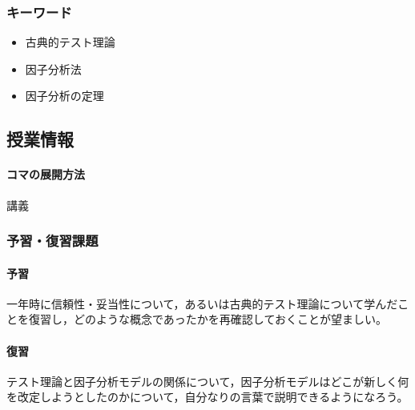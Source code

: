 \subsubsection{キーワード}
\begin{itemize}
	\item 古典的テスト理論
	\item 因子分析法
	\item 因子分析の定理
\end{itemize}
\subsection{授業情報}
\paragraph{コマの展開方法}
講義
\subsubsection{予習・復習課題}
\paragraph{予習}一年時に信頼性・妥当性について，あるいは古典的テスト理論について学んだことを復習し，どのような概念であったかを再確認しておくことが望ましい。
\paragraph{復習}テスト理論と因子分析モデルの関係について，因子分析モデルはどこが新しく何を改定しようとしたのかについて，自分なりの言葉で説明できるようになろう。
